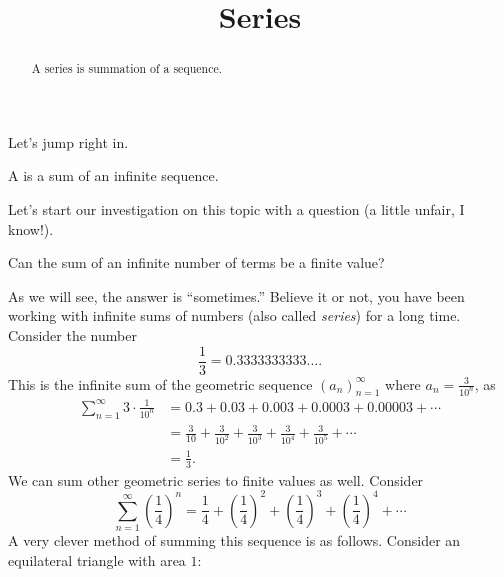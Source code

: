 \documentclass{ximera}
\title[Dig-In:]{Series}
\begin{document}
\begin{abstract}
A series is summation of a sequence.
\end{abstract}
\maketitle


Let's jump right in.


\begin{definition}
  A  is a sum of an infinite sequence.
\end{definition}


Let's start our investigation on this topic with a question (a little unfair, I know!).

\begin{question}
  Can the sum of an infinite number of terms be a finite value?
  \begin{prompt}
    \begin{multipleChoice}
    \end{multipleChoice}
  \end{prompt}
\end{question}
As we will see, the answer is ``sometimes.''  Believe it or not, you
have been working with infinite sums of numbers (also called
\textit{series}) for a long time. Consider the number
\[
\frac{1}{3} = 0.3333333333\dots .
\]
This is the infinite sum of the geometric sequence
$(a_n)_{n=1}^\infty$ where $a_n = \frac{3}{10^{n}}$, as
\begin{align*}
  \sum_{n=1}^\infty 3\cdot \frac{1}{10^{n}} &= 0.3 + 0.03+0.003+ 0.0003+ 0.00003+ \cdots\\
  &= \frac{3}{10} + \frac{3}{10^2} + \frac{3}{10^3} + \frac{3}{10^4} + \frac{3}{10^5} + \cdots\\
  &=\frac{1}{3}.
\end{align*}
We can sum other geometric series to finite values as well. Consider
\[
\sum_{n=1}^\infty \left(\frac{1}{4}\right)^n =
\frac{1}{4} + \left(\frac{1}{4}\right)^2 + \left(\frac{1}{4}\right)^3 + \left(\frac{1}{4}\right)^4 + \cdots 
\]
A very clever method of summing this sequence is as follows. Consider
an equilateral triangle with area $1$:
\begin{image}[1in]
\end{image}
\end{document}
